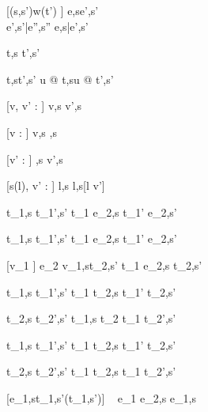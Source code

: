 [\Delta(s,s')\cap w(t') \neq \emptyset]
    {e,s\normalise e',s'\\
    e',s'\bar{\normalise}e'',s''}
    {e,s\bar{\normalise}e',s'}







  {t,s  t',s'}

  {t,st',s'}
  {u @ t,su @ t',s'}

[v, v' : \tau]
  { }
  {\Edit v,s  \Edit v',s}

[v : \tau]
  { }
  {\Edit v,s \handle{\Empty} \Enter \tau,s}

[v' : \tau]
  { }
  {\Enter \tau,s  \Edit v',s}

[s(l), v' : \tau]
  { }
  {\Update l,s  \Update l,s[l \mapsto v']{}}


  {t_1,s  t_1',s'}
  {t_1 \Then e_2,s  t_1' \Then e_2,s'}

  {t_1,s  t_1',s'}
  {t_1 \Next e_2,s  t_1' \Next e_2,s'}

[\equiv v_1 \wedge \neg{}]
  {e_2 v_1,s\normalise t_2,s'}
  {t_1 \Next e_2,s \handle{\Continue} t_2,s'}


  {t_1,s  t_1',s' }
  {t_1 \And t_2,s  t_1' \And t_2,s'}

  {t_2,s  t_2',s'}
  {t_1,s \And t_2  t_1 \And t_2',s'}


  {t_1,s  t_1',s'}
  {t_1 \Or t_2,s  t_1' \Or t_2,s'}

  {t_2,s  t_2',s' }
  {t_1 \Or t_2,s  t_1 \Or t_2',s'}


[e_1,s\evaluate t_1,s'\wedge \neg\Failing(t_1,s')]
  {\ }
  {e_1 \Xor e_2,s \handle{\Left} e_1,s}

